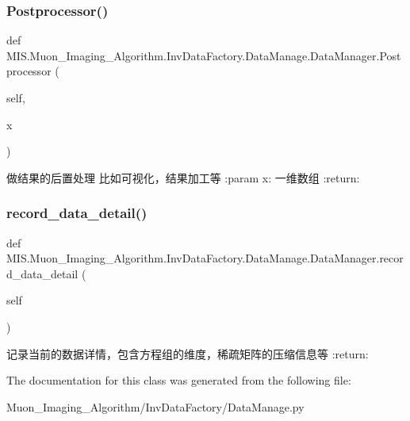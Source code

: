 \subsubsection{\texorpdfstring{Postprocessor()}{Postprocessor()}}
{\footnotesize\ttfamily def M\+I\+S.\+Muon\+\_\+\+Imaging\+\_\+\+Algorithm.\+Inv\+Data\+Factory.\+Data\+Manage.\+Data\+Manager.\+Postprocessor (\begin{DoxyParamCaption}\item[{}]{self,  }\item[{}]{x }\end{DoxyParamCaption})}

\begin{DoxyVerb}做结果的后置处理
比如可视化，结果加工等
:param x: 一维数组
:return:
\end{DoxyVerb}
 \mbox{\label{classMIS_1_1Muon__Imaging__Algorithm_1_1InvDataFactory_1_1DataManage_1_1DataManager_ad630969a4000fc959c01ad7ca2bef025}} 
\subsubsection{\texorpdfstring{record\+\_\+data\+\_\+detail()}{record\_data\_detail()}}
{\footnotesize\ttfamily def M\+I\+S.\+Muon\+\_\+\+Imaging\+\_\+\+Algorithm.\+Inv\+Data\+Factory.\+Data\+Manage.\+Data\+Manager.\+record\+\_\+data\+\_\+detail (\begin{DoxyParamCaption}\item[{}]{self }\end{DoxyParamCaption})}

\begin{DoxyVerb}记录当前的数据详情，包含方程组的维度，稀疏矩阵的压缩信息等
:return:
\end{DoxyVerb}
 

The documentation for this class was generated from the following file\+:\begin{DoxyCompactItemize}
\item 
Muon\+\_\+\+Imaging\+\_\+\+Algorithm/\+Inv\+Data\+Factory/Data\+Manage.\+py\end{DoxyCompactItemize}
